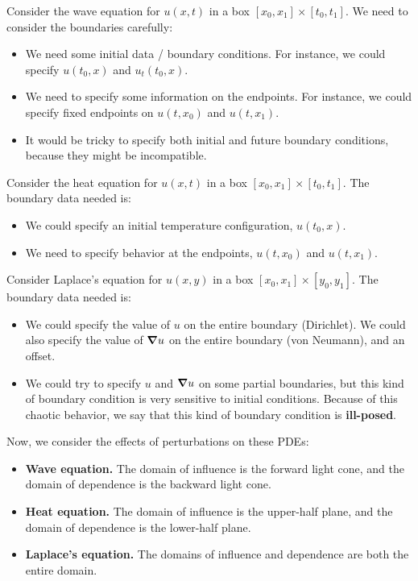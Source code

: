 \documentclass[12pt,letterpaper]{article}
\begin{document}
Consider the wave equation for $u(x,t)$ in a box $[x_0,x_1]\times[t_0,t_1]$. We need to consider the boundaries carefully:
\begin{itemize}
    \item We need some initial data / boundary conditions. For instance, we could specify $u(t_0,x)$ and $u_t(t_0,x)$.
    \item We need to specify some information on the endpoints. For instance, we could specify fixed endpoints on $u(t,x_0)$ and $u(t,x_1)$.
    \item It would be tricky to specify both initial and future boundary conditions, because they might be incompatible.
\end{itemize}
Consider the heat equation for $u(x,t)$ in a box $[x_0,x_1]\times[t_0,t_1]$. The boundary data needed is:
\begin{itemize}
    \item We could specify an initial temperature configuration, $u(t_0,x)$.
    \item We need to specify behavior at the endpoints, $u(t,x_0)$ and $u(t,x_1)$.
\end{itemize}
Consider Laplace's equation for $u(x,y)$ in a box $[x_0,x_1]\times[y_0,y_1]$. The boundary data needed is:
\begin{itemize}
    \item We could specify the value of $u$ on the entire boundary (Dirichlet). We could also specify the value of $\grad u$ on the entire boundary (von Neumann), and an offset.
    \item We could try to specify $u$ and $\grad u$ on some partial boundaries, but this kind of boundary condition is very sensitive to initial conditions. Because of this chaotic behavior, we say that this kind of boundary condition is \textbf{ill-posed}.
\end{itemize}
Now, we consider the effects of perturbations on these PDEs:
\begin{itemize}
    \item \textbf{Wave equation.} The domain of influence is the forward light cone, and the domain of dependence is the backward light cone.
    \item \textbf{Heat equation.} The domain of influence is the upper-half plane, and the domain of dependence is the lower-half plane.
    \item \textbf{Laplace's equation.} The domains of influence and dependence are both the entire domain.
\end{itemize}
\end{document}
